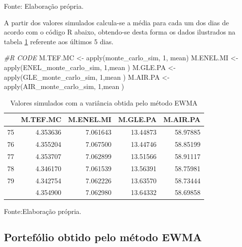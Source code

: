 \documentclass[
  12pt,
  a4paper,
  openany]{book}
\newenvironment{Shaded}{\begin{snugshade}}{\end{snugshade}}
\newcommand{\CommentTok}[1]{\textcolor[rgb]{0.56,0.35,0.01}{\textit{#1}}}
\newcommand{\DecValTok}[1]{\textcolor[rgb]{0.00,0.00,0.81}{#1}}
\newcommand{\FunctionTok}[1]{\textcolor[rgb]{0.00,0.00,0.00}{#1}}
\newcommand{\NormalTok}[1]{#1}
\newcommand{\OtherTok}[1]{\textcolor[rgb]{0.56,0.35,0.01}{#1}}
\theoremstyle{definition}
\theoremstyle{definition}
\theoremstyle{definition}
\theoremstyle{remark}
\begin{document}
Fonte: Elaboração própria.

\justifying
\bigskip

A partir dos valores simulados calcula-se a média para cada um dos dias de acordo com o código R abaixo, obtendo-se desta forma os dados ilustrados na tabela \ref{tab:simtabewma} referente aos últimos 5 dias.

\scriptsize

\begin{Shaded}
\begin{Highlighting}[]
\CommentTok{\#R CODE}
\NormalTok{M.TEF.MC }\OtherTok{\textless{}{-}} \FunctionTok{apply}\NormalTok{(monte\_carlo\_sim, }\DecValTok{1}\NormalTok{, mean)}
\NormalTok{M.ENEL.MI }\OtherTok{\textless{}{-}} \FunctionTok{apply}\NormalTok{(ENEL\_monte\_carlo\_sim, }\DecValTok{1}\NormalTok{,mean )}
\NormalTok{M.GLE.PA }\OtherTok{\textless{}{-}} \FunctionTok{apply}\NormalTok{(GLE\_monte\_carlo\_sim, }\DecValTok{1}\NormalTok{,mean )}
\NormalTok{M.AIR.PA }\OtherTok{\textless{}{-}} \FunctionTok{apply}\NormalTok{(AIR\_monte\_carlo\_sim, }\DecValTok{1}\NormalTok{,mean )}
\end{Highlighting}
\end{Shaded}

\normalsize

\begin{table}[!h]

\caption{\label{tab:simtabewma}Valores simulados com a variância obtida pelo método EWMA}
\centering
\begin{tabular}[t]{lrrrr}
\toprule
  & M.TEF.MC & M.ENEL.MI & M.GLE.PA & M.AIR.PA\\
\midrule
75 & 4.353636 & 7.061643 & 13.44873 & 58.97885\\
76 & 4.355204 & 7.067500 & 13.44746 & 58.85199\\
77 & 4.353707 & 7.062899 & 13.51566 & 58.91117\\
78 & 4.346170 & 7.061539 & 13.56391 & 58.75981\\
79 & 4.342754 & 7.062226 & 13.63570 & 58.73444\\
\addlinespace
80 & 4.354900 & 7.062980 & 13.64332 & 58.69858\\
\bottomrule
\end{tabular}
\end{table}
\FloatBarrier
\centering

Fonte:Elaboração própria.

\justifying
\bigskip

\hypertarget{portefuxf3lio-obtido-pelo-muxe9todo-ewma}{%
\subsection{Portefólio obtido pelo método EWMA}\label{portefuxf3lio-obtido-pelo-muxe9todo-ewma}}
\end{document}
